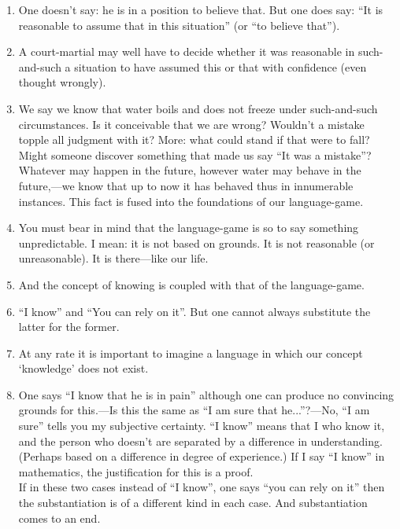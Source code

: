 \documentclass{book}
\begin{document}
\begin{enumerate}
\item
One doesn't say: he is in a position to believe that.  But one does say: ``It
is reasonable to assume that in this situation'' (or ``to believe that'').

\item
A court-martial may well have to decide whether it was reasonable in
such-and-such a situation to have assumed this or that with confidence (even
thought wrongly).

\item
We say we know that water boils and does not freeze under such-and-such
circumstances. Is it conceivable that we are wrong? Wouldn't a mistake topple
all judgment with it? More: what could stand if that were to fall? Might
someone discover something that made us say ``It was a mistake''?  Whatever may
happen in the future, however water may behave in the future,---we know that up
to now it has behaved thus in innumerable instances.  This fact is fused into
the foundations of our language-game.

\item
You must bear in mind that the language-game is so to say something
unpredictable. I mean: it is not based on grounds. It is not reasonable (or
unreasonable).  It is there---like our life.

\item
And the concept of knowing is coupled with that of the language-game.

\item
``I know'' and ``You can rely on it''. But one cannot always substitute the
latter for the former.

\item
At any rate it is important to imagine a language in which our concept
`knowledge' does not exist.

\item
One says ``I know that he is in pain'' although one can produce no convincing
grounds for this.---Is this the same as ``I am sure that he...''?---No, ``I am
sure'' tells you my subjective certainty. ``I know'' means that I who know it,
and the person who doesn't are separated by a difference in understanding.
(Perhaps based on a difference in degree of experience.) If I say ``I know'' in
mathematics, the justification for this is a proof.
\\
If in these two cases instead of ``I know'', one says ``you can rely on it'' then the
substantiation is of a different kind in each case.  And substantiation comes
to an end.


\end{enumerate}
\end{document}
